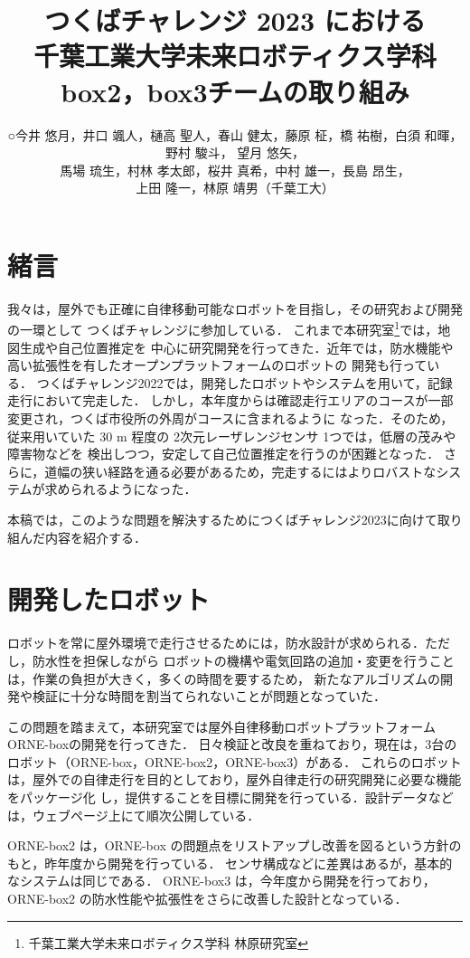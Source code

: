 \documentclass[twocolumn, 9pt]{jsproceedings}
\title{つくばチャレンジ 2023 における\\千葉工業大学未来ロボティクス学科 box2，box3チームの取り組み}
\author{○今井 悠月，井口 颯人，樋高 聖人，春山 健太，藤原 柾，\CID{8705}橋 祐樹，白須 和暉，野村 駿斗，
望月 悠矢，\\馬場 琉生，村林 孝太郎，桜井 真希，中村 雄一，長島 昂生，\\上田 隆一，林原 靖男（千葉工大）}
\affiliation{千葉工業大学未来ロボティクス学科 box2, box3チーム}
\begin{document}
\maketitle

\section{緒言}
我々は，屋外でも正確に自律移動可能なロボットを目指し，その研究および開発の一環として
つくばチャレンジに参加している．
これまで本研究室\footnote{千葉工業大学未来ロボティクス学科 林原研究室}では，地図生成や自己位置推定を
中心に研究開発を行ってきた．近年では，防水機能や高い拡張性を有したオープンプラットフォームのロボットの
開発も行っている．
つくばチャレンジ2022では，開発したロボットやシステムを用いて，記録走行において完走した．
しかし，本年度からは確認走行エリアのコースが一部変更され，つくば市役所の外周がコースに含まれるように
なった．そのため，従来用いていた 30 m 程度の 2次元レーザレンジセンサ 1つでは，低層の茂みや障害物などを
検出しつつ，安定して自己位置推定を行うのが困難となった．
さらに，道幅の狭い経路を通る必要があるため，完走するにはよりロバストなシステムが求められるようになった．

本稿では，このような問題を解決するためにつくばチャレンジ2023に向けて取り組んだ内容を紹介する．

\section{開発したロボット}
ロボットを常に屋外環境で走行させるためには，防水設計が求められる．ただし，防水性を担保しながら
ロボットの機構や電気回路の追加・変更を行うことは，作業の負担が大きく，多くの時間を要するため，
新たなアルゴリズムの開発や検証に十分な時間を割当てられないことが問題となっていた．

この問題を踏まえて，本研究室では屋外自律移動ロボットプラットフォーム ORNE-boxの開発を行ってきた\cite{box}．
日々検証と改良を重ねており，現在は，3台のロボット（ORNE-box，ORNE-box2，ORNE-box3）がある．
これらのロボットは，屋外での自律走行を目的としており，屋外自律走行の研究開発に必要な機能をパッケージ化
し，提供することを目標に開発を行っている．設計データなどは，ウェブページ上にて順次公開している\cite{box-data}．

ORNE-box2 は，ORNE-box の問題点をリストアップし改善を図るという方針のもと，昨年度から開発を行っている．
センサ構成などに差異はあるが，基本的なシステムは同じである．
ORNE-box3 は，今年度から開発を行っており，ORNE-box2 の防水性能や拡張性をさらに改善した設計となっている．
\end{document}
